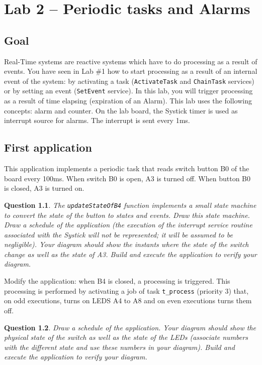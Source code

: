 \documentclass[11pt]{report}
\newtheorem{ex}{Question}
\begin{document}
\chapter{Lab 2 -- Periodic tasks and Alarms}

\section{Goal}

Real-Time systems are reactive systems which have to do processing as a result of events. You have seen in Lab \#1 how to start processing as a result of an internal event of the system: by activating a task (\texttt{ActivateTask} and \texttt{ChainTask} services) or by setting an event (\texttt{SetEvent} service). In this lab, you will trigger processing as a result of time elapsing (expiration of an Alarm). This lab uses the following concepts: alarm and counter. On the lab board, the Systick timer is used as interrupt source for alarms. The interrupt is sent every 1ms.

\section{First application}

This application implements a periodic task that reads switch button B0 of the board every 100ms.
When switch B0 is open, A3 is turned off.
When button B0 is closed, A3 is turned on.

\begin{ex}
    The \texttt{updateStateOfB4} function implements a small state machine to convert the state of the button to states and events.
    Draw this state machine.
    Draw a schedule of the application (the execution of the interrupt service routine associated with the Systick will not be represented; it will be assumed to be negligible).
    Your diagram should show the instants where the state of the switch change as well as the state of A3.
    Build and execute the application to verify your diagram.
\end{ex}

Modify the application: when B4 is closed, a processing is triggered.
This processing is performed by activating a job of task \texttt{t_process} (priority 3) that, on odd executions, turns on LEDS A4 to A8 and on even executions turns them off.
\begin{ex}
Draw a schedule of the application.
Your diagram should show the physical state of the switch as well as the state of the LEDs (associate numbers with the different state and use these numbers in your diagram).
Build and execute the application to verify your diagram.
\end{ex}
\end{document}

